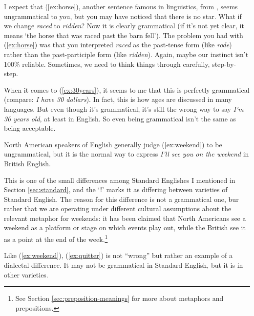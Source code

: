 \label{ex:horse}
\z

I expect that (\ref{ex:horse}), another sentence famous in linguistics, from \citet{bever1971}, seems ungrammatical to you, but you may have noticed that there is no star. What if we change \textit{raced} to \textit{ridden}? Now it is clearly grammatical (if it's not yet clear, it means `the horse that was raced past the barn fell'). The problem you had with (\ref{ex:horse}) was that you interpreted \textit{raced} as the past-tense form (like \textit{rode}) rather than the past-participle form (like \textit{ridden}). Again, maybe our instinct isn't 100\% reliable. Sometimes, we need to think things through carefully, step-by-step.

When it comes to (\ref{ex:30years}), it seems to me that this is perfectly grammatical (compare: \textit{I have 30 dollars}). In fact, this is how ages are discussed in many languages. But even though it's grammatical, it's still the wrong way to say \textit{I'm 30 years old}, at least in English. So even being grammatical isn't the same as being acceptable.
\label{ex:30years}
\z

North American speakers of English generally judge (\ref{ex:weekend}) to be ungrammatical, but it is the normal way to express \textit{I'll see you on the weekend} in British English.

\label{ex:weekend}
\z

This is one of the small differences among Standard Englishes I mentioned in Section \ref{sec:standard}, and the `!' marks it as differing between varieties of Standard English. The reason for this difference is not a grammatical one, bur rather that we are operating under different cultural assumptions about the relevant metaphor for weekends: it has been claimed that North Americans see a weekend as a platform or stage on which events play out, while the British see it as a point at the end of the week.\footnote{See Section \ref{sec:preposition-meanings} for more about metaphors and prepositions.}

\label{ex:quitter}
\z

Like (\ref{ex:weekend}), (\ref{ex:quitter}) is not ``wrong'' but rather an example of a dialectal difference. It may not be grammatical in Standard English, but it is in other varieties.

